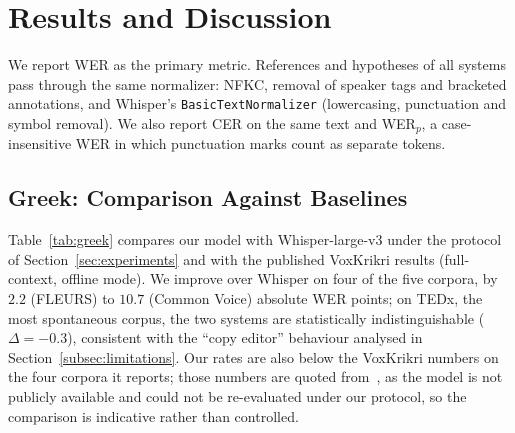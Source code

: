 \documentclass{article}
\begin{document}
\section{Results and Discussion}
We report WER as the primary metric. References and hypotheses of all systems pass through the same normalizer: NFKC, removal of speaker tags and bracketed annotations, and Whisper's \texttt{BasicTextNormalizer} (lowercasing, punctuation and symbol removal). We also report CER on the same text and WER$_p$, a case-insensitive WER in which punctuation marks count as separate tokens.

\subsection{Greek: Comparison Against Baselines}
\noindent
Table~\ref{tab:greek} compares our model with Whisper-large-v3 under the protocol of Section~\ref{sec:experiments} and with the published VoxKrikri results (full-context, offline mode). We improve over Whisper on four of the five corpora, by $2.2$ (FLEURS) to $10.7$ (Common Voice) absolute WER points; on TEDx, the most spontaneous corpus, the two systems are statistically indistinguishable ($\Delta=-0.3$), consistent with the ``copy editor'' behaviour analysed in Section~\ref{subsec:limitations}. Our rates are also below the VoxKrikri numbers on the four corpora it reports; those numbers are quoted from~\cite{damianos2025voxkrikriunifyingspeechlanguage}, as the model is not publicly available and could not be re-evaluated under our protocol, so the comparison is indicative rather than controlled.

\begin{table}[h]
\centering
\caption{Greek ASR performance. WER (\%) is the primary metric; WER$_p$ additionally scores punctuation and CER is the character error rate, both reported for our model for completeness.}
\label{tab:greek}
\footnotesize
{}
\end{table}
\end{document}
